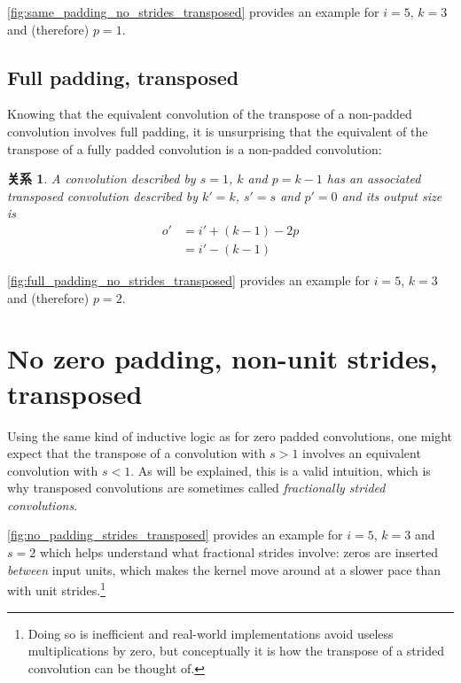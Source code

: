 \documentclass[notitlepage]{ctexrep}
\newtheorem{relationship}{关系}
\begin{document}
\autoref{fig:same_padding_no_strides_transposed} provides an example for $i =
5$, $k = 3$ and (therefore) $p = 1$.

\subsection{Full padding, transposed}

Knowing that the equivalent convolution of the transpose of a non-padded
convolution involves full padding, it is unsurprising that the equivalent of
the transpose of a fully padded convolution is a non-padded convolution:

\begin{relationship}\label{rel:full_padding_no_strides_transposed}
A convolution described by $s = 1$, $k$ and $p = k - 1$ has an
associated transposed convolution described by $k' = k$, $s' = s$ and $p' = 0$
and its output size is
\begin{equation*}
\begin{split}
    o' &= i' + (k - 1) - 2p \\
       &= i' - (k - 1)
\end{split}
\end{equation*}
\end{relationship}

\autoref{fig:full_padding_no_strides_transposed} provides an example for $i =
5$, $k = 3$ and (therefore) $p = 2$.

\section{No zero padding, non-unit strides, transposed}

Using the same kind of inductive logic as for zero padded convolutions, one
might expect that the transpose of a convolution with $s > 1$ involves an
equivalent convolution with $s < 1$. As will be explained, this is a valid
intuition, which is why transposed convolutions are sometimes called {\em
fractionally strided convolutions}.

\autoref{fig:no_padding_strides_transposed} provides an example for $i = 5$, $k
= 3$ and $s = 2$ which helps understand what fractional strides involve: zeros
are inserted {\em between\/} input units, which makes the kernel move around at
a slower pace than with unit strides.\footnote{Doing so is inefficient and
    real-world implementations avoid useless multiplications by zero, but
    conceptually it is how the transpose of a strided convolution can be
    thought of.}
\end{document}
